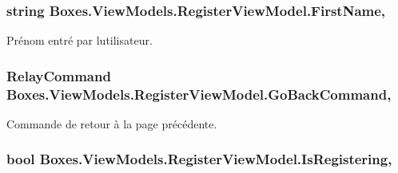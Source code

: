 \subsubsection[{\texorpdfstring{First\+Name}{FirstName}}]{\setlength{\rightskip}{0pt plus 5cm}string Boxes.\+View\+Models.\+Register\+View\+Model.\+First\+Name\hspace{0.3cm}{\ttfamily [get]}, {\ttfamily [set]}}\hypertarget{class_boxes_1_1_view_models_1_1_register_view_model_ade9e9b19aa0dd12d6a2a602b31589028}{}\label{class_boxes_1_1_view_models_1_1_register_view_model_ade9e9b19aa0dd12d6a2a602b31589028}


Prénom entré par l\textquotesingle{}utilisateur. 

\subsubsection[{\texorpdfstring{Go\+Back\+Command}{GoBackCommand}}]{\setlength{\rightskip}{0pt plus 5cm}Relay\+Command Boxes.\+View\+Models.\+Register\+View\+Model.\+Go\+Back\+Command\hspace{0.3cm}{\ttfamily [get]}, {}}\hypertarget{class_boxes_1_1_view_models_1_1_register_view_model_a995a3cce93db8b0f82262ce814c52514}{}\label{class_boxes_1_1_view_models_1_1_register_view_model_a995a3cce93db8b0f82262ce814c52514}


Commande de retour à la page précédente. 

\subsubsection[{\texorpdfstring{Is\+Registering}{IsRegistering}}]{\setlength{\rightskip}{0pt plus 5cm}bool Boxes.\+View\+Models.\+Register\+View\+Model.\+Is\+Registering\hspace{0.3cm}{\ttfamily [get]}, {\ttfamily [set]}}\hypertarget{class_boxes_1_1_view_models_1_1_register_view_model_aadd1c445ed909526cf2ff9ffa1604e7c}{}\label{class_boxes_1_1_view_models_1_1_register_view_model_aadd1c445ed909526cf2ff9ffa1604e7c}


